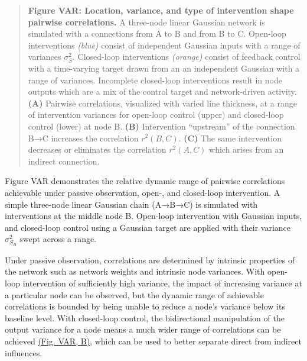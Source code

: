 \documentclass{article}
\begin{document}
\begin{quote}
\textbf{Figure VAR: Location, variance, and type of intervention shape pairwise correlations.} A three-node linear Gaussian network is simulated with a connections from A to B and from B to C. Open-loop interventions \emph{(blue)} consist of independent Gaussian inputs with a range of variances \(\sigma^2_S\). Closed-loop interventions
\emph{(orange)} consist of feedback control with a time-varying target drawn from an an independent Gaussian with a range of variances. Incomplete closed-loop interventions result in node outputs which are a mix of the control target and network-driven activity. \textbf{(A)}
Pairwise correlations, visualized with varied line thickness, at a range of intervention variances for open-loop control (upper) and closed-loop control (lower) at node B. \textbf{(B)} Intervention ``upstream'' of the connection B→C increases the correlation \(r^2(B,C)\). \textbf{(C)} The same intervention decreases or eliminates the correlation \(r^2(A,C)\)
which arises from an indirect connection.
\end{quote}

Figure VAR demonstrates the relative dynamic range of pairwise correlations achievable under passive observation, open-, and closed-loop intervention. A simple three-node linear Gaussian chain
(A→B→C) is simulated with interventions at the middle node B. Open-loop intervention with Gaussian inputs, and closed-loop control using a Gaussian target are applied with their variance \(\sigma^2_{S_B}\) swept across a range.

Under passive observation, correlations are determined by intrinsic properties of the network such as network weights and intrinsic node variances. With open-loop intervention of sufficiently high variance, the impact of increasing variance at a particular node can be observed, but the dynamic range of achievable correlations is bounded by being unable to reduce a node's variance below its baseline level. With closed-loop control, the bidirectional manipulation of the output variance for a node means a much wider range of correlations can be achieved \protect\hyperlink{fig-var}{(Fig. VAR, B)}, which can be used to better separate direct from indirect influences.
\end{document}
